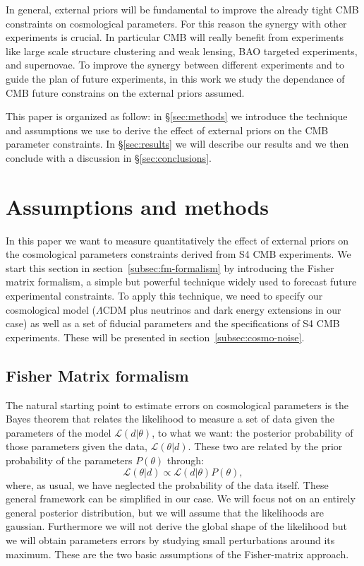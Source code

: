 \documentclass[aps,prd,reprint,superscriptaddress]{revtex4-1}
\newcommand\refsec[1]{\S\ref{sec:#1}}
\newcommand{\refssec}[1]{section~\ref{subsec:#1}}
\begin{document}
In general, external priors will be fundamental to improve the already tight CMB constraints on cosmological parameters. For this reason the synergy with other experiments is crucial. In particular CMB will really benefit from experiments like large scale structure clustering and weak lensing, BAO targeted experiments, and supernovae. 
To improve the synergy between different experiments and to guide the plan of future experiments, in this work we study the dependance of CMB future constrains on the external priors assumed.

This paper is organized as follow: in \refsec{methods} we introduce the technique and assumptions we use to derive the effect of external priors on the CMB parameter constraints. In \refsec{results} we will describe our results and we then conclude with a discussion in \refsec{conclusions}.



\section{Assumptions and methods \label{sec:methods}}
In this paper we want to measure quantitatively the effect of external priors on the  cosmological parameters constraints derived from S4 CMB experiments.
We start this section in \refssec{fm-formalism} by introducing the Fisher matrix formalism, a simple but powerful technique widely used to forecast future experimental constraints. To apply this technique, we need to specify our cosmological model ($\Lambda$CDM plus neutrinos and dark energy extensions in our case) as well as a set of fiducial parameters and the specifications of S4 CMB experiments. These will be presented in \refssec{cosmo-noise}.


\subsection{Fisher Matrix formalism \label{subsec:fm-formalism}}
The natural starting point to estimate errors on cosmological parameters is the Bayes theorem that relates the likelihood to measure a set of data given the parameters of the model $\mathcal{L}(d|\theta)$, to what we want: the posterior probability of those parameters given the data, $\mathcal{L}(\theta|d)$.
These two are related by the prior probability of the parameters $P(\theta)$ through:
\begin{equation}
\mathcal{L}(\theta|d)\propto \mathcal{L}(d|\theta)P(\theta),
\end{equation}
where, as usual, we have neglected the probability of the data itself.
These general framework can be simplified in our case. We will focus not on an entirely general posterior distribution, but we will assume that the likelihoods are gaussian.
Furthermore we will not derive the global shape of the likelihood but we will obtain parameters errors by studying small perturbations around its maximum. These are the two basic assumptions of the Fisher-matrix approach.
\end{document}
